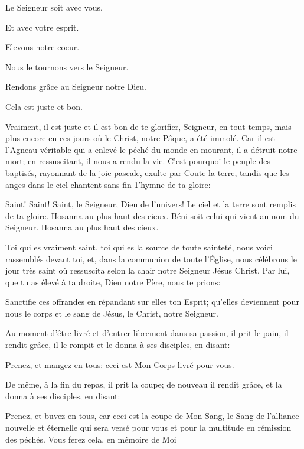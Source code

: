 \pr Le Seigneur soit avec vous.

\be Et avec votre esprit.

\pr Elevons notre coeur.

\be Nous le tournons vers le Seigneur.

\pr Rendons grâce au Seigneur notre Dieu.

\be Cela est juste et bon.

\pr Vraiment, il est juste et il est bon de te glorifier, Seigneur, en tout temps, mais plus encore en ces jours où le Christ, notre Pâque, a été immolé. Car il est l’Agneau véritable qui a enlevé le péché du monde en mourant, il a détruit notre mort; en ressuscitant, il nous a rendu la vie. C’est pourquoi le peuple des baptisés, rayonnant de la joie pascale, exulte par Coute la terre, tandis que les anges dans le ciel chantent sans fin 1'hymne de ta gloire:

\be Saint! Saint! Saint, le Seigneur, Dieu de l'univers! \redast Le ciel et la terre sont remplis de ta gloire. \redast Hosanna au plus haut des cieux. \redast Béni soit celui qui vient au nom du Seigneur. \redast Hosanna au plus haut des cieux.

\pr Toi qui es vraiment saint, toi qui es la source de toute sainteté, nous voici rassemblés devant toi, et, dans la communion de toute l’Église, nous célébrons le jour très saint où ressuscita selon la chair notre Seigneur Jésus Christ. Par lui, que tu as élevé à ta droite, Dieu notre Père, nous te prions:

\pr Sanctifie ces offrandes en répandant sur elles ton Esprit; qu’elles deviennent pour nous le corps et le sang de Jésus, le Christ, notre Seigneur.

\pr Au moment d'être livré et d'entrer librement dans sa passion, il prit le pain, il rendit grâce, il le rompit et le donna à ses disciples, en disant:

\vspace{1em}
\eu Prenez, et mangez-en tous: ceci est Mon Corps livré pour vous.
\vspace{0.8em}

\pr De même, à la fin du repas, il prit la coupe; de nouveau il rendit grâce, et la donna à ses disciples, en disant:

\vspace{1em}
\eu Prenez, et buvez-en tous, car ceci est la coupe de Mon Sang, le Sang de l'alliance nouvelle et éternelle qui sera versé pour vous et pour la multitude en rémission des péchés. Vous ferez cela, en mémoire de Moi
\vspace{0.8em}

